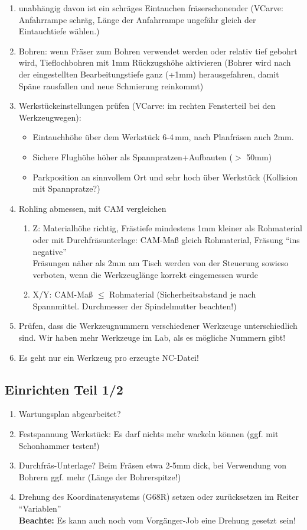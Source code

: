 \documentclass{\basedir/fablab-document}
\renewcommand{\todo}[1]{\colorbox{yellow}{{#1}}}
\begin{document}
\begin{enumerate}
	\item unabhängig davon ist ein schräges Eintauchen fräserschonender (VCarve: Anfahrrampe schräg, Länge der Anfahrrampe ungefähr gleich der Eintauchtiefe wählen.)
	\item Bohren: wenn Fräser zum Bohren verwendet werden oder relativ tief gebohrt wird, Tieflochbohren mit 1mm Rückzugshöhe aktivieren (Bohrer wird nach der eingestellten Bearbeitungstiefe ganz (+1mm) herausgefahren, damit Späne rausfallen und neue Schmierung reinkommt)
	\item Werkstückeinstellungen prüfen (VCarve: im rechten Fensterteil bei den Werkzeugwegen):
\begin{itemize}
	\item Eintauchhöhe über dem Werkstück 6-4\,mm, nach Planfräsen auch 2mm.
	\item Sichere Flughöhe höher als Spannpratzen+Aufbauten ($>$ 50mm)
	\item Parkposition an sinnvollem Ort und sehr hoch über Werkstück (Kollision mit Spannpratze?)
\end{itemize}
	\item Rohling abmessen, mit CAM vergleichen
 \begin{enumerate}
	\item Z: Materialhöhe richtig, Frästiefe mindestens 1mm kleiner als Rohmaterial \\
        oder mit Durchfräsunterlage: CAM-Maß gleich Rohmaterial, Fräsung \enquote{ins negative}\\
        Fräsungen näher als 2mm am Tisch werden von der Steuerung sowieso verboten, wenn die Werkzeuglänge korrekt eingemessen wurde
	\item X/Y: CAM-Maß $\leq$ Rohmaterial (Sicherheitsabstand je nach Spannmittel. Durchmesser der Spindelmutter beachten!)
 \end{enumerate}
	\item Prüfen, dass die Werkzeugnummern verschiedener Werkzeuge unterschiedlich sind. Wir haben mehr Werkzeuge im Lab, als es mögliche Nummern gibt!
	\item Es geht nur ein Werkzeug pro erzeugte NC-Datei!%
\end{enumerate}

\subsection{Einrichten Teil 1/2} \label{einrichten}
\begin{enumerate}
	\item Wartungsplan abgearbeitet?
	\item Festspannung Werkstück: Es darf nichts mehr wackeln können (ggf. mit Schonhammer testen!)
	\item Durchfräs-Unterlage? Beim Fräsen etwa 2-5mm dick, bei Verwendung von Bohrern ggf. mehr (Länge der Bohrerspitze!)
	\item Drehung des Koordinatensystems (G68R) setzen oder zurücksetzen im Reiter \enquote{Variablen}\\ \textbf{Beachte:} Es kann auch noch vom Vorgänger-Job eine Drehung gesetzt sein!
\end{enumerate}
\end{document}
